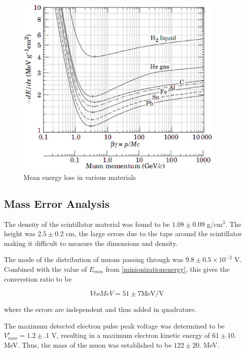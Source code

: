 \label{energy_loss}
\begin{figure}[h]
\begin{center}
\includegraphics[height = 90mm]{figures/energy_loss.eps}
\caption{\small{Mean energy loss in various materials \cite{yao.}}}
\label{figure:dEdx}
\end{center}
\end{figure}

\subsection{Mass Error Analysis}

The density of the scintillator material was found to be $1.08 \pm
0.09$ g/cm$^3$. The height was $2.5 \pm 0.2$ cm, the large errors due
to the tape around the scintillator making it difficult to measure the
dimensions and density.

The mode of the distribution of muons passing through was $9.8 \pm 0.5
\times 10^{-2}$ V.  Combined with the value of $E_{min}$ from
\ref{minionizationenergy}, this gives the converstion ratio to be

\begin{equation} VtoMeV = 51 \pm 7 \mathrm{ MeV/V} \end{equation}   

where the errors are independent and thus added in quadrature.

The maximum detected electron pulse peak voltage was determined to be
$V_{max}^e = 1.2 \pm .1$ V, resulting in a maximum electron kinetic
energy of $61\pm 10.$ MeV. Thus, the mass of the muon was established
to be $122 \pm 20.$ MeV. 
